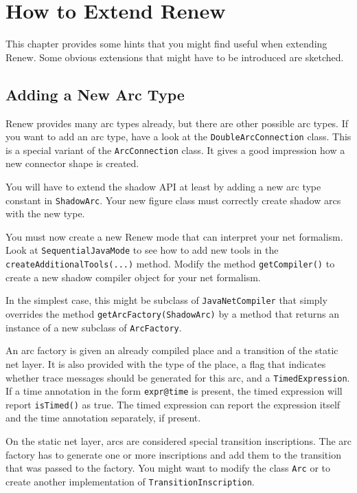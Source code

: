 \chapter{How to Extend Renew}

This chapter provides some hints that you might find useful
when extending Renew. Some obvious extensions that might have
to be introduced are sketched.

\section{Adding a New Arc Type}\label{sec:addarctype}

Renew provides many arc types already, but there are other
possible arc types. If you want to add an arc type,
have a look at the \texttt{DoubleArcConnection}
class. This is a special variant of the \texttt{ArcConnection} class.
It gives a good impression how a new connector shape is
created.

You will have to extend the shadow API at least by adding a
new arc type constant in \texttt{ShadowArc}. Your new figure class
must correctly create shadow arcs with the new type.

You must now create a new Renew mode that can interpret your
net formalism. Look at \texttt{SequentialJavaMode}
to see how to add new tools in the
\texttt{createAdditionalTools(...)} method.
Modify the method \texttt{getCompiler()} to create a new shadow
compiler object for your net formalism.

In the simplest case, this might be subclass of \texttt{JavaNetCompiler}
that simply overrides the method \texttt{getArcFactory(ShadowArc)}
by a method that returns an instance of a new subclass of
\texttt{ArcFactory}.

An arc factory is given an already compiled place and a transition
of the static net layer. It is also provided with the
type of the place, a flag that indicates whether trace messages
should be generated for this arc, and a \texttt{TimedExpression}.
If a time annotation in the form \texttt{expr@time} is present,
the timed expression will report \texttt{isTimed()} as true.
The timed expression can report the expression itself and the time
annotation separately, if present.

On the static net layer, arcs are considered special
transition inscriptions. The arc factory has to generate
one or more inscriptions and add them to the transition that was passed
to the factory. You might want to modify the class \texttt{Arc} or to
create another implementation of \texttt{TransitionInscription}.

